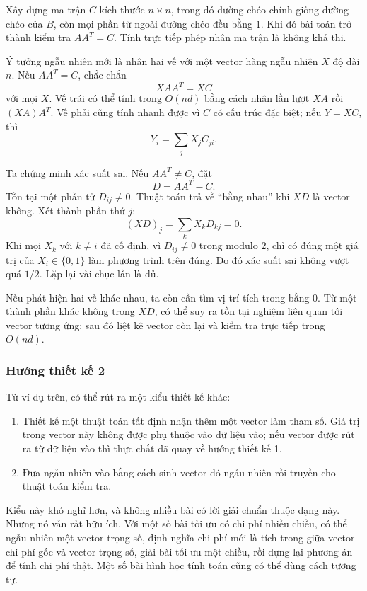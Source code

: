 \documentclass[11pt]{article}
\begin{document}
Xây dựng ma trận \(C\) kích thước \(n\times n\), trong đó đường chéo chính giống
đường chéo của \(B\), còn mọi phần tử ngoài đường chéo đều bằng \(1\). Khi đó
bài toán trở thành kiểm tra \(A A^T=C\). Tính trực tiếp phép nhân ma trận là
không khả thi.

Ý tưởng ngẫu nhiên mới là nhân hai vế với một vector hàng ngẫu nhiên \(X\) độ
dài \(n\). Nếu \(A A^T=C\), chắc chắn
\[
  X A A^T = X C
\]
với mọi \(X\). Vế trái có thể tính trong \(O(nd)\) bằng cách nhân lần lượt
\(X A\) rồi \((X A)A^T\). Vế phải cũng tính nhanh được vì \(C\) có cấu trúc đặc
biệt; nếu \(Y=XC\), thì
\[
  Y_i=\sum_j X_j C_{ji}.
\]

Ta chứng minh xác suất sai. Nếu \(A A^T\ne C\), đặt
\[
  D=A A^T-C.
\]
Tồn tại một phần tử \(D_{ij}\ne 0\). Thuật toán trả về ``bằng nhau'' khi
\(X D\) là vector không. Xét thành phần thứ \(j\):
\[
  (XD)_j=\sum_k X_kD_{kj}=0.
\]
Khi mọi \(X_k\) với \(k\ne i\) đã cố định, vì \(D_{ij}\ne0\) trong modulo \(2\),
chỉ có đúng một giá trị của \(X_i\in\{0,1\}\) làm phương trình trên đúng. Do đó
xác suất sai không vượt quá \(1/2\). Lặp lại vài chục lần là đủ.

Nếu phát hiện hai vế khác nhau, ta còn cần tìm vị trí tích trong bằng \(0\).
Từ một thành phần khác không trong \(XD\), có thể suy ra tồn tại nghiệm liên
quan tới vector tương ứng; sau đó liệt kê vector còn lại và kiểm tra trực tiếp
trong \(O(nd)\).

\subsubsection{Hướng thiết kế 2}

Từ ví dụ trên, có thể rút ra một kiểu thiết kế khác:
\begin{enumerate}
  \item Thiết kế một thuật toán tất định nhận thêm một vector làm tham số. Giá
  trị trong vector này không được phụ thuộc vào dữ liệu vào; nếu vector được rút
  ra từ dữ liệu vào thì thực chất đã quay về hướng thiết kế 1.
  \item Đưa ngẫu nhiên vào bằng cách sinh vector đó ngẫu nhiên rồi truyền cho
  thuật toán kiểm tra.
\end{enumerate}

Kiểu này khó nghĩ hơn, và không nhiều bài có lời giải chuẩn thuộc dạng này.
Nhưng nó vẫn rất hữu ích. Với một số bài tối ưu có chi phí nhiều chiều, có thể
ngẫu nhiên một vector trọng số, định nghĩa chi phí mới là tích trong giữa vector
chi phí gốc và vector trọng số, giải bài tối ưu một chiều, rồi dựng lại phương
án để tính chi phí thật. Một số bài hình học tính toán cũng có thể dùng cách
tương tự.
\end{document}
